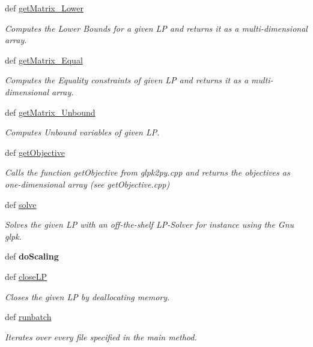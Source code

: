 \begin{DoxyCompactItemize}
def \hyperlink{namespacesymLPExperiments_a92bdbf0ba2cc9cde5c83ecc88f48bdc9}{get\-Matrix\-\_\-\-Lower}
\begin{DoxyCompactList}\small\item\em Computes the Lower Bounds for a given L\-P and returns it as a multi-\/dimensional array. \end{DoxyCompactList}\item 
def \hyperlink{namespacesymLPExperiments_aeff528f7778911571744f131ba25fa5b}{get\-Matrix\-\_\-\-Equal}
\begin{DoxyCompactList}\small\item\em Computes the Equality constraints of given L\-P and returns it as a multi-\/dimensional array. \end{DoxyCompactList}\item 
def \hyperlink{namespacesymLPExperiments_a4be7dae61f3f79886fa2d2f015fef1b5}{get\-Matrix\-\_\-\-Unbound}
\begin{DoxyCompactList}\small\item\em Computes Unbound variables of given L\-P. \end{DoxyCompactList}\item 
def \hyperlink{namespacesymLPExperiments_a8d2d07c1a8b150727dec946b71f19854}{get\-Objective}
\begin{DoxyCompactList}\small\item\em Calls the function get\-Objective from glpk2py.\-cpp and returns the objectives as one-\/dimensional array (see get\-Objective.\-cpp) \end{DoxyCompactList}\item 
def \hyperlink{namespacesymLPExperiments_a9149118eedae9835161d4188f43de77a}{solve}
\begin{DoxyCompactList}\small\item\em Solves the given L\-P with an off-\/the-\/shelf L\-P-\/\-Solver for instance using the Gnu glpk. \end{DoxyCompactList}\item 
\hypertarget{namespacesymLPExperiments_ad16c25f2fef221aa9e16be530727cf07}{def {\bfseries do\-Scaling}}\label{namespacesymLPExperiments_ad16c25f2fef221aa9e16be530727cf07}

\item 
def \hyperlink{namespacesymLPExperiments_af0c1f995f0246facbabd21b2bd88b7de}{close\-L\-P}
\begin{DoxyCompactList}\small\item\em Closes the given L\-P by deallocating memory. \end{DoxyCompactList}\item 
def \hyperlink{namespacesymLPExperiments_a0b36c729a222467b8abb13726eeee5f5}{runbatch}
\begin{DoxyCompactList}\small\item\em Iterates over every file specified in the main method. \end{DoxyCompactList}\end{DoxyCompactItemize}
